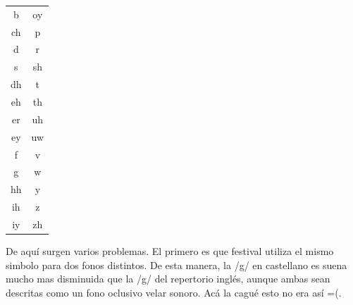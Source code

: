 \begin{table}
\begin{minipage}[t]{0.3\textwidth}
\begin{tabular}[t]{cc}
 b  &oy\\
 ch & p \\
 d  &r \\
 s  &sh\\
 dh & t\\
 eh & th \\
 er & uh \\
 ey & uw \\
 f  &v\\
 g  &w\\
 hh & y\\
 ih & z\\
 iy & zh \\
\bottomrule
\end{tabular}
\end{minipage}
\end{table}

De aquí surgen varios problemas. El primero es que festival utiliza el mismo simbolo para dos fonos distintos. De esta manera, la /g/ en castellano es suena mucho mas disminuida que la /g/ del repertorio inglés, aunque ambas sean descritas como un fono oclusivo velar sonoro. Acá la cagué esto no era así =(.

\verEnElCorpus

